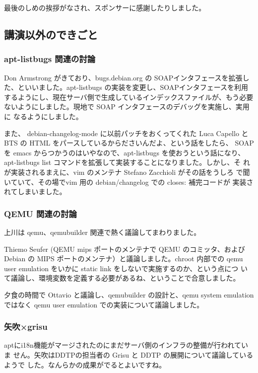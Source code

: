 \documentclass[mingoth,a4paper]{jsarticle}
\begin{document}
最後のしめの挨拶がなされ、スポンサーに感謝したりしました。

\subsection{講演以外のできごと}

\subsubsection{apt-listbugs 関連の討論}

Don Armstrong がきており、bugs.debian.org の SOAPインタフェースを拡張し
た、といいました。apt-listbugs の実装を変更し、SOAPインタフェースを利用
するようにし、現在サーバ側で生成しているインデックスファイルが、もう必要
ないようにしました。現地で SOAP インタフェースのデバッグを実施し、実用に
なるようにしました。

また、 debian-changelog-mode に以前パッチをおくってくれた Luca Capello 
と BTS の HTML をパースしているからださいんだよ、という話をしたら、 SOAP 
を emacs からつかうのはいやなので、apt-listbugs を使おうという話になり、 
apt-listbugs list コマンドを拡張して実装することになりました。しかし、そ
れが実装されるまえに、vim のメンテナ Stefano Zacchioli がその話をうしろ
で聞いていて、その場でvim 用の debian/changelog での closes: 補完コードが
実装されてしまいました。

\subsubsection{QEMU 関連の討論}

上川は qemu、qemubuilder 関連で熱く議論してまわりました。

Thiemo Seufer (QEMU mips ポートのメンテナで QEMU のコミッタ、および
Debian の MIPS ポートのメンテナ）と議論しました。chroot 内部での qemu
user emulation をいかに static link をしないで実施するのか、という点につ
いて議論し、環境変数を定義する必要があるね、ということで合意しました。

夕食の時間で Ottavio と議論し、qemubuilder の設計と、qemu system
emulation ではなく qemu user emulation での実装について議論しました。


\subsubsection{矢吹×grisu}

aptにi18n機能がマージされたのにまだサーバ側のインフラの整備が行われていま
せん。矢吹はDDTPの担当者の Grisu と DDTP の展開について議論しているようで
した。なんらかの成果がでるとよいですね。
\end{document}
